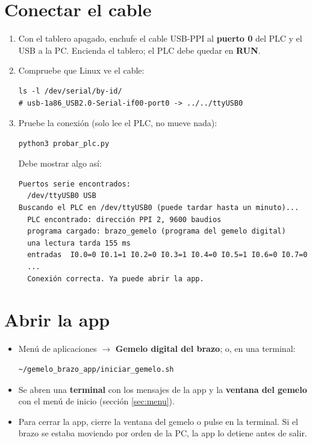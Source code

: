 \documentclass[a4paper,11pt]{article}
\begin{document}
\section{Conectar el cable}
\begin{enumerate}
\item Con el tablero apagado, enchufe el cable USB-PPI al \textbf{puerto 0} del PLC y el USB a la PC. Encienda el tablero; el PLC debe quedar en \textbf{RUN}.
\item Compruebe que Linux ve el cable:
\begin{lstlisting}
ls -l /dev/serial/by-id/
# usb-1a86_USB2.0-Serial-if00-port0 -> ../../ttyUSB0
\end{lstlisting}
\item Pruebe la conexión (solo lee el PLC, no mueve nada):
\begin{lstlisting}
python3 probar_plc.py
\end{lstlisting}
Debe mostrar algo así:
\begin{lstlisting}
Puertos serie encontrados:
  /dev/ttyUSB0 USB
Buscando el PLC en /dev/ttyUSB0 (puede tardar hasta un minuto)...
  PLC encontrado: dirección PPI 2, 9600 baudios
  programa cargado: brazo_gemelo (programa del gemelo digital)
  una lectura tarda 155 ms
  entradas  I0.0=0 I0.1=1 I0.2=0 I0.3=1 I0.4=0 I0.5=1 I0.6=0 I0.7=0
  ...
  Conexión correcta. Ya puede abrir la app.
\end{lstlisting}
\end{enumerate}


\section{Abrir la app}
\begin{itemize}
\item Menú de aplicaciones $\rightarrow$ \textbf{Gemelo digital del brazo}; o, en una terminal:
\begin{lstlisting}
~/gemelo_brazo_app/iniciar_gemelo.sh
\end{lstlisting}
\item Se abren una \textbf{terminal} con los mensajes de la app y la \textbf{ventana del gemelo} con el menú de inicio (sección \ref{sec:menu}).
\item Para cerrar la app, cierre la ventana del gemelo o pulse  en la terminal. Si el brazo se estaba moviendo por orden de la PC, la app lo detiene antes de salir.
\end{itemize}
\end{document}
